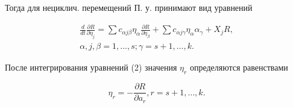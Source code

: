 \documentclass[10pt]{article}
\begin{document}
Тогда для нециклич. перемещений П. у. принимают вид уравнений



\[

\begin{gathered}

\frac{d}{d t} \frac{\partial R}{\partial \eta_{j}}=\sum c_{\alpha j \beta} \eta_{\alpha} \frac{\partial R}{\partial \eta_{\beta}}+\sum c_{\alpha j \gamma} \eta_{\alpha} \alpha_{\gamma}+X_{j} R, \\

\alpha, j, \beta=1, \ldots, s ; \gamma=s+1, \ldots, k .

\end{gathered}

\]



После интегрирования уравнений (2) значения $\eta_{r}$ определяются равенствами



\[

\eta_{r}=-\frac{\partial R}{\partial a_{r}}, r=s+1, \ldots, k .

\]
\end{document}
